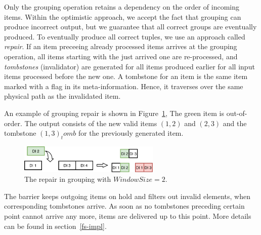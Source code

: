 Only the grouping operation retains a dependency on the order of incoming items. 
%
Within the  optimistic approach, we accept the fact that grouping can produce incorrect output, but we guarantee that all correct groups are eventually produced. 
To eventually produce all correct tuples, we use an approach called {\it repair}. 
If an item preceeing already processed items arrives at the grouping operation, all items starting with the just arrived one are re-processed, and {\em tombstones} (invalidator) are generated for all items produced earlier for all input items processed before the new one. A tombstone for an item is the same item marked with a flag in its meta-information. Hence, it traverses over the same physical path as the invalidated item.

An example of grouping repair is shown in Figure~\ref{grouping-replaying}, 
The green item is out-of-order. 
The output consists of the new valid items  $(1, 2)$ and $(2, 3)$  and the tombstone $(1, 3)_tomb$ for the previously generated item.

\begin{figure}[ht]
  \centering
  \includegraphics[width=0.6\textwidth]{pics/grouping-replaying}
  \caption{The repair in grouping with $WindowSize = 2$. %
  }
  \label {grouping-replaying}
\end{figure}


The barrier  keeps outgoing items on hold and filters out invalid elements, when corresponding tombstones arrive. 
As soon as no tombstones preceding certain point cannot arrive any more, items are delivered  up to this point. 
%
More details can be found  in section~\ref{fs-impl}.


